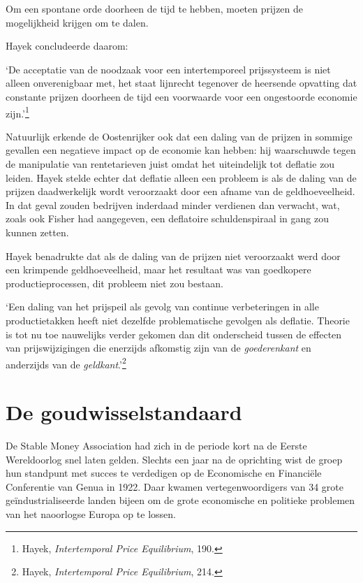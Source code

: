 \documentclass[
  a5paper,
  smalldemyvopaper,11pt,twoside,onecolumn,openright,extrafontsizes,
hidelinks]{memoir}
\renewenvironment{quote}%
               {\list{}{\rightmargin=.3cm\leftmargin=.3cm}%
                \itshape \item[]}%
               {\endlist}
\begin{document}
Om een spontane orde doorheen de tijd te hebben, moeten prijzen de
mogelijkheid krijgen om te dalen.

Hayek concludeerde daarom:

\begin{quote}
`De acceptatie van de noodzaak voor een intertemporeel prijssysteem is
niet alleen onverenigbaar met, het staat lijnrecht tegenover de
heersende opvatting dat constante prijzen doorheen de tijd een
voorwaarde voor een ongestoorde economie zijn.'\footnote{\hspace{0pt}Hayek,
  \emph{Intertemporal Price Equilibrium}, 190.}
\end{quote}

Natuurlijk erkende de Oostenrijker ook dat een daling van de prijzen in
sommige gevallen een negatieve impact op de economie kan hebben: hij
waarschuwde tegen de manipulatie van rentetarieven juist omdat het
uiteindelijk tot deflatie zou leiden. Hayek stelde echter dat deflatie
alleen een probleem is als de daling van de prijzen daadwerkelijk wordt
veroorzaakt door een afname van de geldhoeveelheid. In dat geval zouden
bedrijven inderdaad minder verdienen dan verwacht, wat, zoals ook Fisher
had aangegeven, een deflatoire schuldenspiraal in gang zou kunnen
zetten.

Hayek benadrukte dat als de daling van de prijzen niet veroorzaakt werd
door een krimpende geldhoeveelheid, maar het resultaat was van
goedkopere productieprocessen, dit probleem niet zou bestaan.

\begin{quote}
`Een daling van het prijspeil als gevolg van continue verbeteringen in
alle productietakken heeft niet dezelfde problematische gevolgen als
deflatie. Theorie is tot nu toe nauwelijks verder gekomen dan dit
onderscheid tussen de effecten van prijswijzigingen die enerzijds
afkomstig zijn van de \emph{goederenkant} en anderzijds van de
\emph{geldkant}.'\footnote{\hspace{0pt}Hayek, \emph{Intertemporal Price
  Equilibrium}, 214.}
\end{quote}

\section{De goudwisselstandaard}\label{de-goudwisselstandaard}

De Stable Money Association had zich in de periode kort na de Eerste
Wereldoorlog snel laten gelden. Slechts een jaar na de oprichting wist
de groep hun standpunt met succes te verdedigen op de Economische en
Financiële Conferentie van Genua in 1922. Daar kwamen vertegenwoordigers
van 34 grote geïndustrialiseerde landen bijeen om de grote economische
en politieke problemen van het naoorlogse Europa op te lossen.
\end{document}
